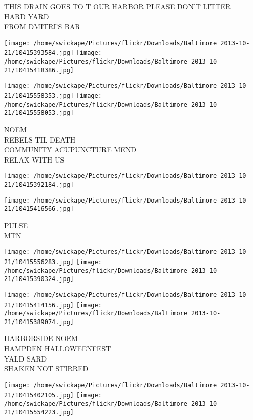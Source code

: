 \documentclass[10pt,letterpaper]{article}
\begin{document}
THIS DRAIN GOES TO T OUR HARBOR PLEASE DON'T LITTER\\
HARD YARD\\
FROM DMITRI'S BAR\\
\pagebreak

\texttt{[image: /home/swickape/Pictures/flickr/Downloads/Baltimore 2013-10-21/10415393584.jpg]}
\texttt{[image: /home/swickape/Pictures/flickr/Downloads/Baltimore 2013-10-21/10415418386.jpg]}

\texttt{[image: /home/swickape/Pictures/flickr/Downloads/Baltimore 2013-10-21/10415558353.jpg]}
\texttt{[image: /home/swickape/Pictures/flickr/Downloads/Baltimore 2013-10-21/10415558053.jpg]}

NOEM\\
REBELS TIL DEATH\\
COMMUNITY ACUPUNCTURE MEND\\
RELAX WITH US\\
\pagebreak

\texttt{[image: /home/swickape/Pictures/flickr/Downloads/Baltimore 2013-10-21/10415392184.jpg]}

\vspace{0.25in}
\texttt{[image: /home/swickape/Pictures/flickr/Downloads/Baltimore 2013-10-21/10415416566.jpg]}

PULSE\\
MTN\\
\pagebreak

\texttt{[image: /home/swickape/Pictures/flickr/Downloads/Baltimore 2013-10-21/10415556283.jpg]}
\texttt{[image: /home/swickape/Pictures/flickr/Downloads/Baltimore 2013-10-21/10415390324.jpg]}

\texttt{[image: /home/swickape/Pictures/flickr/Downloads/Baltimore 2013-10-21/10415414156.jpg]}
\texttt{[image: /home/swickape/Pictures/flickr/Downloads/Baltimore 2013-10-21/10415389074.jpg]}

HARBORSIDE NOEM\\
HAMPDEN HALLOWEENFEST\\
YALD SARD\\
SHAKEN NOT STIRRED\\
\pagebreak

\texttt{[image: /home/swickape/Pictures/flickr/Downloads/Baltimore 2013-10-21/10415402105.jpg]}
\texttt{[image: /home/swickape/Pictures/flickr/Downloads/Baltimore 2013-10-21/10415554223.jpg]}
\end{document}
